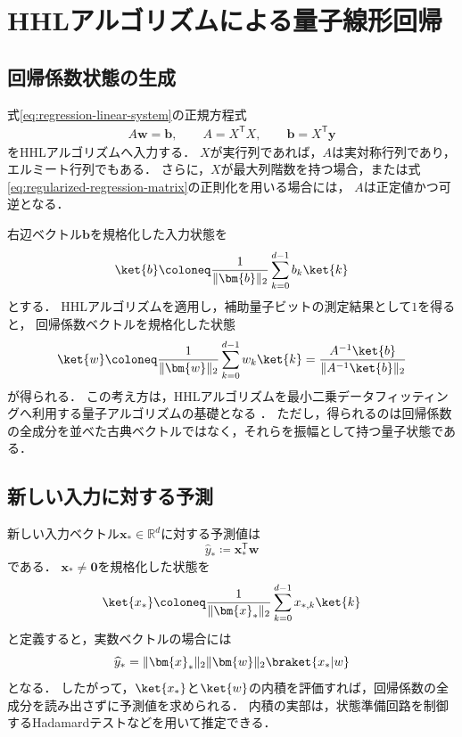 \section{HHLアルゴリズムによる量子線形回帰}
\label{sec:hhl-quantum-linear-regression}

\subsection{回帰係数状態の生成}
\label{subsec:regression-coefficient-state}

式\eqref{eq:regression-linear-system}の正規方程式
\begin{align*}
  A\bm{w}=\bm{b},
  \qquad
  A=X^{\mathsf{T}}X,
  \qquad
  \bm{b}=X^{\mathsf{T}}\bm{y}
\end{align*}
をHHLアルゴリズムへ入力する．
$X$が実行列であれば，$A$は実対称行列であり，エルミート行列でもある．
さらに，$X$が最大列階数を持つ場合，または式\eqref{eq:regularized-regression-matrix}の正則化を用いる場合には，
$A$は正定値かつ可逆となる．

右辺ベクトル$\bm{b}$を規格化した入力状態を
\begin{equation}
  \ket{b}
  \coloneq
  \frac{1}{\|\bm{b}\|_2}
  \sum_{k=0}^{d-1}b_k\ket{k}
  \label{eq:regression-b-state}
\end{equation}
とする．
HHLアルゴリズムを適用し，補助量子ビットの測定結果として$1$を得ると，
回帰係数ベクトルを規格化した状態
\begin{equation}
  \ket{w}
  \coloneq
  \frac{1}{\|\bm{w}\|_2}
  \sum_{k=0}^{d-1}w_k\ket{k}
  =
  \frac{A^{-1}\ket{b}}{\|A^{-1}\ket{b}\|_2}
  \label{eq:regression-coefficient-quantum-state}
\end{equation}
が得られる．
この考え方は，HHLアルゴリズムを最小二乗データフィッティングへ利用する量子アルゴリズムの基礎となる
\cite{shimada2020}．
ただし，得られるのは回帰係数の全成分を並べた古典ベクトルではなく，それらを振幅として持つ量子状態である．

\subsection{新しい入力に対する予測}
\label{subsec:prediction-from-coefficient-state}

新しい入力ベクトル$\bm{x}_{*}\in\mathbb{R}^{d}$に対する予測値は
\begin{equation}
  \widehat{y}_{*}
  \coloneq
  \bm{x}_{*}^{\mathsf{T}}\bm{w}
  \label{eq:new-data-prediction}
\end{equation}
である．
$\bm{x}_{*}\neq\bm{0}$を規格化した状態を
\begin{equation}
  \ket{x_{*}}
  \coloneq
  \frac{1}{\|\bm{x}_{*}\|_2}
  \sum_{k=0}^{d-1}x_{*,k}\ket{k}
  \label{eq:new-input-state}
\end{equation}
と定義すると，実数ベクトルの場合には
\begin{equation}
  \widehat{y}_{*}
  =
  \|\bm{x}_{*}\|_2\|\bm{w}\|_2
  \braket{x_{*}|w}
  \label{eq:prediction-as-overlap}
\end{equation}
となる．
したがって，$\ket{x_{*}}$と$\ket{w}$の内積を評価すれば，回帰係数の全成分を読み出さずに予測値を求められる．
内積の実部は，状態準備回路を制御するHadamardテストなどを用いて推定できる．

